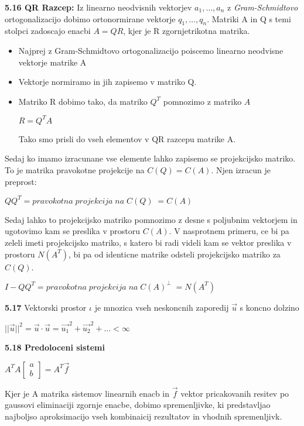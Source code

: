 \documentclass{article}
\begin{document}
\begin{multicols}{4}
\textbf{5.16 QR Razcep:} Iz linearno neodvisnih vektorjev $a_{1}, \dots, a_{n}$ z \textit{Gram-Schmidtovo} ortogonalizacijo
dobimo ortonormirane vektorje $q_{1}, \dots, q_{n}$. Matriki A in Q s temi stolpci zadoscajo enacbi $A = QR$, kjer
je R zgornjetrikotna matrika.
\begin{itemize}
    \item Najprej z Gram-Schmidtovo ortogonalizacijo poiscemo linearno neodvisne vektorje matrike A
    \item Vektorje normiramo in jih zapisemo v matriko Q.
    \item Matriko R dobimo tako, da matriko $Q^{T}$ pomnozimo z matriko $A$
    \begin{center}
        \begin{math}
            R = Q^{T}A
        \end{math}
    \end{center}
    Tako smo prisli do vseh elementov v QR razcepu matrike A.
\end{itemize}
Sedaj ko imamo izracunane vse elemente lahko zapisemo se projekcijsko matriko. To je matrika pravokotne projekcije na $C(Q) = C(A)$.
Njen izracun je preprost:
\begin{center}
    \begin{math}
        QQ^{T} = pravokotna\; projekcija\; na\; C(Q)\; = C(A)
    \end{math}
\end{center}
Sedaj lahko to projekcijsko matriko pomnozimo z desne s poljubnim vektorjem in ugotovimo kam se preslika v prostoru $C(A)$.
V nasprotnem primeru, ce bi pa zeleli imeti projekcijsko matriko, s katero bi radi videli kam se vektor preslika v prostoru $N(A^{T})$, bi pa od identicne matrike
odsteli projekcijsko matriko za $C(Q)$.
\begin{center}
    \begin{math}
        I - QQ^{T} = pravokotna\; projekcija\; na\; C(A)^{\perp}\; = N(A^{T})
    \end{math}
\end{center}

\textbf{5.17} Vektorski prostor $\iota$ je mnozica vseh neskoncnih zaporedij $\vec{u}$ s koncno
dolzino
\begin{center}
    $||\vec{u}||^{2} = \vec{u} \cdot \vec{u} = \vec{u_{1}}^{2} + \vec{u_{2}}^{2} + \dots < \infty$
\end{center}

\textbf{5.18 Predoloceni sistemi}
\begin{center}
    \begin{math}
        A^{T}A
        \begin{bmatrix}
            a\\
            b
        \end{bmatrix}
        = A^{T}\vec{f}
    \end{math}
\end{center}
Kjer je A matrika sistemov linearnih enacb in $\vec{f}$ vektor pricakovanih resitev
po gaussovi eliminaciji zgornje enacbe, dobimo spremenljivke, ki predstavljao najboljso aproksimacijo vseh kombinaicij rezultatov in vhodnih spremenljivk.


\end{multicols}
\end{document}
